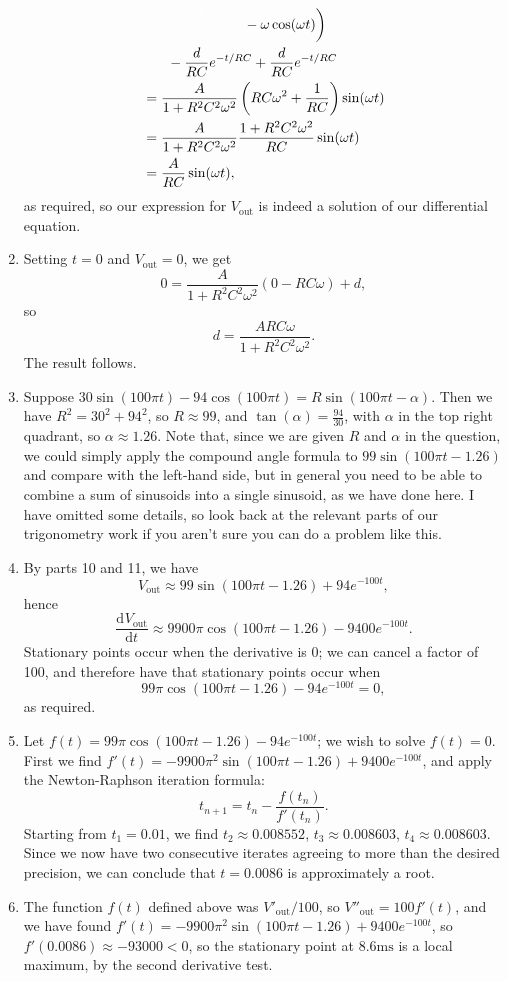 \documentclass{article}
\newcommand{\deriv}[3][]{\frac{\mathrm{d}^{#1} #2}{\mathrm{d}#3^{#1}}}
\begin{document}
\begin{enumerate}
\begin{align*}
			&\left.{\color{white} = \frac{A}{1+R^2C^2\omega^2}(} -\omega\cos(\omega t)\right)\\
			&{\color{white}=\quad} -\frac{d}{RC}e^{-t/RC}+\frac{d}{RC}e^{-t/RC}\\
			&= \frac{A}{1+R^2C^2\omega^2}\left( RC\omega^2+\frac{1}{RC}\right)\sin(\omega t)\\
			&= \frac{A}{1+R^2C^2\omega^2}\frac{1+R^2C^2\omega^2}{RC}\sin(\omega t)\\
			&=\frac{A}{RC}\sin(\omega t),
		\end{align*}
		as required, so our expression for $V_\mathrm{out}$ is indeed a solution of our differential equation.
	\item Setting $t=0$ and $V_\mathrm{out}=0$, we get
		\[0=\frac{A}{1+R^2C^2\omega^2}\left(0-RC\omega\right)  + d,\]
		so
		\[d=\frac{ARC\omega}{1+R^2C^2\omega^2}.\]
		The result follows.
	\item Suppose $30\sin(100\pi t)-94\cos(100\pi t)=R\sin(100\pi t-\alpha)$. Then we have $R^2=30^2+94^2$, so $R\approx 99$, and $\tan(\alpha)=\frac{94}{30}$, with $\alpha$ in the top right quadrant, so $\alpha\approx 1.26$. Note that, since we are given $R$ and $\alpha$ in the question, we could simply apply the compound angle formula to $99\sin(100\pi t-1.26)$ and compare with the left-hand side, but in general you need to be able to combine a sum of sinusoids into a single sinusoid, as we have done here. I have omitted some details, so look back at the relevant parts of our trigonometry work if you aren't sure you can do a problem like this.
	\item By parts 10 and 11, we have
		\[V_\mathrm{out}\approx 99\sin(100\pi t-1.26)+94e^{-100t},\]
		hence
		\[\deriv{V_\mathrm{out}}{t}\approx 9900\pi\cos(100\pi t-1.26)-9400e^{-100 t}.\]
		Stationary points occur when the derivative is 0; we can cancel a factor of 100, and therefore have that stationary points occur when
		\[99\pi\cos(100\pi t-1.26)-94e^{-100t}=0,\]
		as required.
	\item Let $f(t)=99\pi\cos(100\pi t-1.26)-94e^{-100t}$; we wish to solve $f(t)=0$. First we find $f'(t)=-9900\pi^2\sin(100\pi t-1.26) +9400e^{-100t}$, and apply the Newton-Raphson iteration formula:
		\[t_{n+1}=t_n-\frac{f(t_n)}{f'(t_n)}.\]
		Starting from $t_1=0.01$, we find $t_2\approx 0.008552$, $t_3\approx 0.008603$, $t_4\approx0.008603$. Since we now have two consecutive iterates agreeing to more than the desired precision, we can conclude that $t=0.0086$ is approximately a root.
	\item The function $f(t)$ defined above was $V'_\mathrm{out}/100$, so $V''_\mathrm{out}=100f'(t)$, and we have found $f'(t)=-9900\pi^2\sin(100\pi t-1.26)+9400e^{-100t}$, so $f'(0.0086)\approx-93000<0$, so the stationary point at $8.6\mathrm{ms}$ is a local maximum, by the second derivative test.

\end{enumerate}
\end{document}
